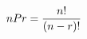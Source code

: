 \documentclass[preview]{standalone}
\begin{document}
\begin{align*}
\special{dvisvgm:raw <g id='unique000'>}nPr = \frac{n!}{(n-r)!}\special{dvisvgm:raw </g>}
\end{align*}
\end{document}
